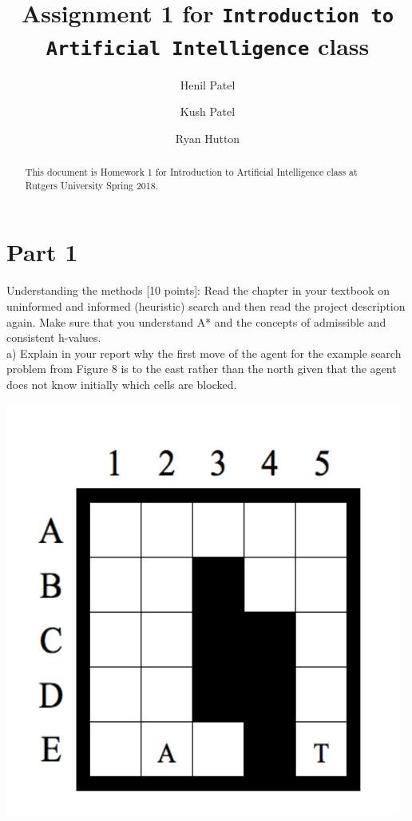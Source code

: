 \documentclass[preprint,12pt,3p]{elsarticle}
\begin{document}
\begin{frontmatter}

\title{Assignment 1 for \texttt{Introduction to Artificial Intelligence} class}


\author[label1,label2]{Henil Patel}


\author[label5]{Kush Patel}
\address[label5]{Rutgers University}

\author[label1,label5]{Ryan Hutton}


\begin{abstract}
This document is Homework 1 for Introduction to Artificial Intelligence class at Rutgers University Spring 2018.
\end{abstract}


\end{frontmatter}


\section{Part 1}
\label{sec1}

Understanding the methods [10 points]: Read the chapter in your textbook on uninformed and informed (heuristic) search and then read the project description again. Make sure that you understand A* and the concepts of admissible and consistent h-values.\\

a) Explain in your report why the first move of the agent for the example search problem from Figure 8 is to the east rather than the north given that the agent does not know initially which cells are blocked.\\

\graphicspath{ {images/} }

\includegraphics{graph4}
\end{document}
